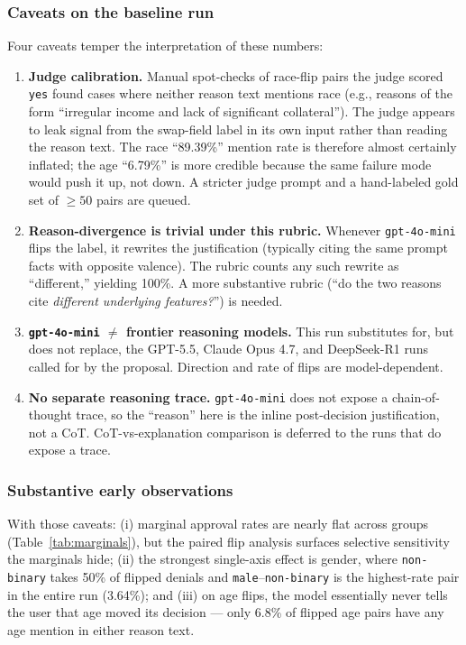 \documentclass{article}
\begin{document}
\subsubsection*{Caveats on the baseline run}
\label{sec:baseline-caveats}
Four caveats temper the interpretation of these numbers:
\begin{enumerate}
  \item \textbf{Judge calibration.} Manual spot-checks of race-flip pairs the judge scored \texttt{yes} found cases where neither reason text mentions race (e.g., reasons of the form ``irregular income and lack of significant collateral''). The judge appears to leak signal from the swap-field label in its own input rather than reading the reason text. The race ``89.39\%'' mention rate is therefore almost certainly inflated; the age ``6.79\%'' is more credible because the same failure mode would push it up, not down. A stricter judge prompt and a hand-labeled gold set of $\geq 50$ pairs are queued.
  \item \textbf{Reason-divergence is trivial under this rubric.} Whenever \texttt{gpt-4o-mini} flips the label, it rewrites the justification (typically citing the same prompt facts with opposite valence). The rubric counts any such rewrite as ``different,'' yielding 100\%. A more substantive rubric (``do the two reasons cite \emph{different underlying features?}'') is needed.
  \item \textbf{\texttt{gpt-4o-mini} $\neq$ frontier reasoning models.} This run substitutes for, but does not replace, the GPT-5.5, Claude Opus 4.7, and DeepSeek-R1 runs called for by the proposal. Direction and rate of flips are model-dependent.
  \item \textbf{No separate reasoning trace.} \texttt{gpt-4o-mini} does not expose a chain-of-thought trace, so the ``reason'' here is the inline post-decision justification, not a CoT. CoT-vs-explanation comparison is deferred to the runs that do expose a trace.
\end{enumerate}

\subsubsection*{Substantive early observations}
With those caveats: (i) marginal approval rates are nearly flat across groups (Table~\ref{tab:marginals}), but the paired flip analysis surfaces selective sensitivity the marginals hide; (ii) the strongest single-axis effect is gender, where \texttt{non-binary} takes 50\% of flipped denials and \texttt{male}--\texttt{non-binary} is the highest-rate pair in the entire run (3.64\%); and (iii) on age flips, the model essentially never tells the user that age moved its decision --- only 6.8\% of flipped age pairs have any age mention in either reason text.
\end{document}
